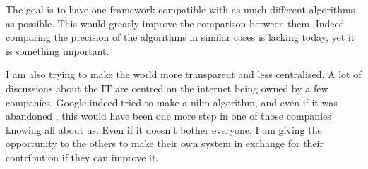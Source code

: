 The goal is to have one framework compatible with as much different algorithms as possible. This would greatly improve the comparison between them. Indeed comparing the precision of the algorithms in similar cases is lacking today, yet it is something important.

I am also trying to make the world more transparent and less centralised. A lot of discussions about the IT are centred on the internet being owned by a few companies. Google indeed tried to make a \acrshort{nilm} algorithm, and even if it was abandoned \cite{googleabandon}, this would have been one more step in one of those companies knowing all about us. Even if it doesn't bother everyone, I am giving the opportunity to the others to make their own system in exchange for their contribution if they can improve it.